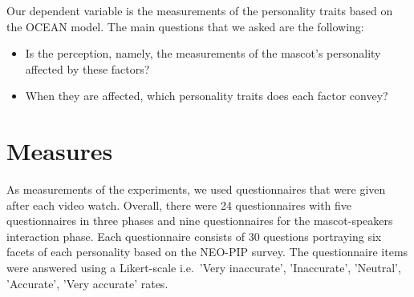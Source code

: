 Our dependent variable is the measurements of the personality traits based on the OCEAN model.
The main questions that we asked are the following:
\begin{itemize}
  \item Is the perception, namely, the measurements of the mascot’s personality affected by these factors?
  \item When they are affected, which personality traits does each factor convey?
\end{itemize}

\section{Measures}
\label{sec:measures}
As measurements of the experiments, we used questionnaires that were given after each video watch.
Overall, there were 24 questionnaires with five questionnaires in three phases and nine questionnaires
for the mascot-speakers interaction phase.
Each questionnaire consists of 30 questions portraying six facets of each personality based on the NEO-PIP survey.
The questionnaire items were answered using a Likert-scale
i.e.\ 'Very inaccurate', 'Inaccurate', 'Neutral', 'Accurate', 'Very accurate' rates.



